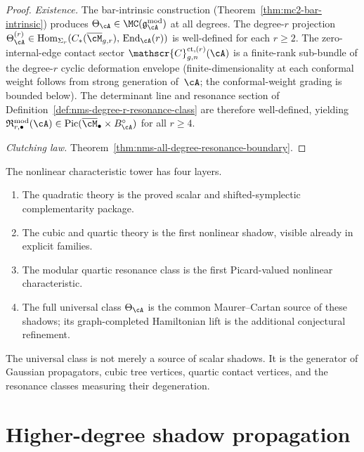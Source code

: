 \begin{proof}
\emph{Existence.}\;
The bar-intrinsic construction
(Theorem~\ref{thm:mc2-bar-intrinsic}) produces
$\Theta_{\cA} \in \MC(\gAmod)$ at all degrees.
The degree-$r$ projection
$\Theta_{\cA}^{(r)} \in
\operatorname{Hom}_{\Sigma_r}(
C_*(\overline{\cM}_{g,r}),\,
\operatorname{End}_{\cA}(r))$
is well-defined for each $r \geq 2$. The zero-internal-edge
contact sector
$\mathscr{C}^{\mathrm{ct},(r)}_{g,n}(\cA)$ is a
finite-rank sub-bundle of the degree-$r$ cyclic deformation
envelope (finite-dimensionality at each conformal weight
follows from strong generation of~$\cA$; the conformal-weight
grading is bounded below). The determinant line and
resonance section of
Definition~\ref{def:nms-degree-r-resonance-class}
are therefore well-defined, yielding
$\mathfrak{R}_{r,\bullet}^{\mathrm{mod}}(\cA) \in
\operatorname{Pic}(\overline{\cM}_\bullet \times
B_\cA^\circ)$ for all $r \geq 4$.

\emph{Clutching law.}\;
Theorem~\ref{thm:nms-all-degree-resonance-boundary}.
\end{proof}

\begin{remark}
\label{rem:nms-frontier-reset}
The nonlinear characteristic tower has four layers.
\begin{enumerate}[label=\textup{(\roman*)}]
\item The quadratic theory is the proved scalar and shifted-symplectic complementarity package.
\item The cubic and quartic theory is the first nonlinear shadow, visible already in explicit families.
\item The modular quartic resonance class is the first Picard-valued nonlinear characteristic.
\item The full universal class $\Theta_{\cA}$ is the common
Maurer--Cartan source of these shadows; its graph-completed
Hamiltonian lift is the additional conjectural refinement.
\end{enumerate}
The universal class is not merely a source of scalar shadows. It is the generator of Gaussian propagators, cubic tree vertices, quartic contact vertices, and the resonance classes measuring their degeneration.
\end{remark}

\section{Higher-degree shadow propagation}
\label{sec:nms-higher-degree-propagation}

